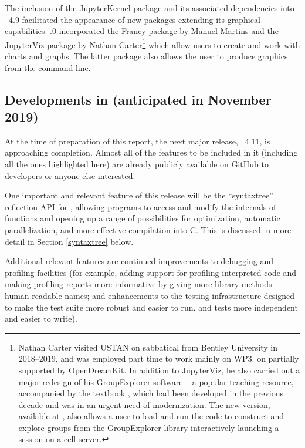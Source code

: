 The inclusion of the {\sf JupyterKernel} package and its associated 
dependencies into \GAP~4.9 facilitated the appearance of new packages
extending its graphical capabilities. .0 incorporated 
the {\sf Francy} package \cite{Francy} by Manuel Martins and
the {\sf JupyterViz} package \cite{JupyterViz} by 
Nathan Carter\footnote{Nathan Carter visited USTAN on sabbatical from
Bentley University in 2018--2019, and was employed part time to work
mainly on WP3. 
on 
 partially supported by OpenDreamKit.
In addition to {\sf JupyterViz}, he also carried out a major redesign
of his {\sf GroupExplorer} software -- a popular teaching resource, 
accompanied by the textbook \cite{Carter-book}, which had been developed
in the previous decade and was in an
urgent need of modernization. The new version, available
at \cite{GroupExplorer}, also allows a user to load and run the \GAP code
to construct and explore groups from the {\sf GroupExplorer} library
interactively launching a \GAP session on a \SageMath cell server.
}
which allow users to create and work with charts and graphs. The latter
package also allows the user to produce graphics from the \GAP command line.


\subsection{Developments in  (anticipated in November 2019)}\label{gap-4.11}



At the time of preparation of this report, the next major release,
\GAP~4.11,
is approaching completion. Almost all of the features to be
included in it (including all the ones highlighted here) are already
publicly  available on GitHub to developers or anyone else interested.

One important and relevant feature of this release will be the ``syntaxtree'' reflection
API for \GAP, allowing \GAP programs to access and modify the internals of \GAP
functions and opening up a range of possibilities for optimization, automatic
parallelization, and more effective compilation into C. This is
discussed in more detail in Section \ref{syntaxtree} below. 

Additional relevant features are continued improvements to debugging and
profiling facilities (for example,
adding support for profiling interpreted code
and 
making profiling reports more informative by 
giving more library methods human-readable names;
and enhancements to the testing infrastructure designed to make the
test suite more robust and easier to run, and tests more independent
and easier to write).

